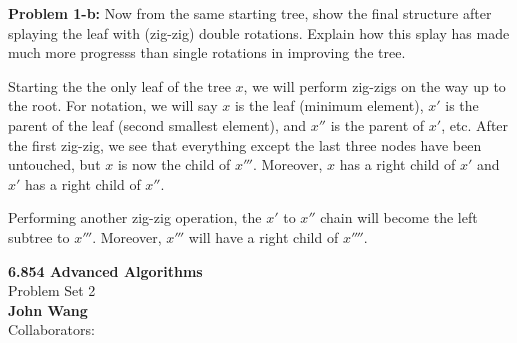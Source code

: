 \documentclass[psamsfonts]{amsart}
\newenvironment{sol}{\vspace{0.25cm}{\large \bfseries Solution:}}{\qedsymbol}
\newenvironment{prob}[1]{\begin{framed}{\large \bfseries Problem #1:}}{\end{framed}}
\newcommand{\makenewtitle}{
\begin{center}
{\huge \bfseries 6.854 Advanced Algorithms} \\
Problem Set 2\\
\vspace{0.25cm}
{\bfseries John Wang} \\
Collaborators:
\end{center}
\vspace{0.5cm}
}
\begin{document}
\begin{prob}{1-b}
Now from the same starting tree, show the final structure after splaying the leaf with (zig-zig) double rotations. Explain how this splay has made much more progresss than single rotations in improving the tree.
\end{prob}

\begin{sol}
Starting the the only leaf of the tree $x$, we will perform zig-zigs on the way up to the root. For notation, we will say $x$ is the leaf (minimum element), $x'$ is the parent of the leaf (second smallest element), and $x''$ is the parent of $x'$, etc. After the first zig-zig, we see that everything except the last three nodes have been untouched, but $x$ is now the child of $x'''$. Moreover, $x$ has a right child of $x'$ and $x'$ has a right child of $x''$. 

Performing another zig-zig operation, the $x'$ to $x''$ chain will become the left subtree to $x'''$. Moreover, $x'''$ will have a right child of $x''''$.  
\end{sol}

\newpage

\makenewtitle
\end{document}
